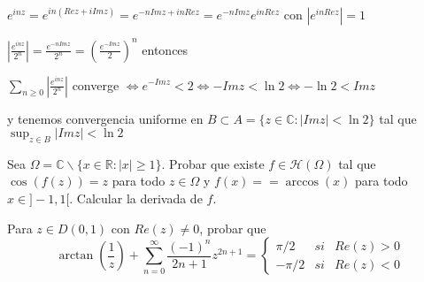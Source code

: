 $e^{inz} = e^{in(Rez+iImz)} = e^{-nImz+inRez} = e^{-nImz}e^{inRez}$ con $|e^{inRez}|=1$

$|\frac{e^{inz}}{2^n}| = \frac{e^{-nImz}}{2^n} = (\frac{e^{-Imz}}{2})^n$
entonces

$\sum_{n\geq 0} |\frac{e^{inz}}{2^n}|$ converge $\Longleftrightarrow e^{-Imz} < 2 \Longleftrightarrow -Imz < \ln 2 \Longleftrightarrow -\ln 2 < Imz$

y tenemos convergencia uniforme en $B\subset A= \{ z\in\mathbb{C} : |Imz|<\ln 2 \}$ tal que $\sup_{z\in B} |Imz| < \ln 2$


\begin{ejer}
	Sea $\Omega = \mathbb{C}\backslash\{ x\in\mathbb{R} : |x|\geq 1 \}$. Probar que existe $f\in\mathcal{H}(\Omega)$ tal que $\cos(f(z)) = z$ para todo $z\in\Omega$ y $f(x)==\arccos(x)$ para todo $x\in]-1,1[$. Calcular la derivada de $f$.
\end{ejer}


\begin{ejer}
	Para $z\in D(0,1)$ con $Re(z) \not =0$, probar que
	$$ \arctan\left(\frac{1}{z}\right) + \sum_{n=0}^{\infty} \frac{(-1)^n}{2n+1}z^{2n+1} = \left\{ \begin{array}{lcc}
	\pi/2  &   si  & Re(z)>0 \\
	-\pi/2 &  si & Re(z)<0 \end{array}
	\right. $$
\end{ejer}